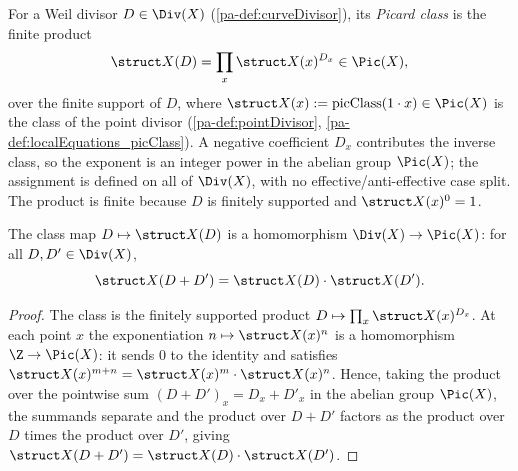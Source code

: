\begin{definition}
  \label{pa-def:divisorClass}
  \leanok

  For a Weil divisor \(D \in \Div(X)\) (\ref{pa-def:curveDivisor}), its \emph{Picard class} is the
  finite product
  \[
    \struct X(D) = \prod_{x} \struct X(x)^{D_x} \in \Pic(X),
  \]
  over the finite support of \(D\), where \(\struct X(x) := \mathrm{picClass}(1 \cdot x) \in
  \Pic(X)\) is the class of the point divisor (\ref{pa-def:pointDivisor}, \ref{pa-def:localEquations_picClass}).
  A negative coefficient \(D_x\) contributes the inverse class, so the exponent is an integer power
  in the abelian group \(\Pic(X)\); the assignment is defined on all of \(\Div(X)\), with no
  effective/anti-effective case split. The product is finite because \(D\) is finitely supported
  and \(\struct X(x)^0 = 1\).
\end{definition}

\begin{theorem}
  \label{pa-thm:divisorClass_add}
  \leanok

  The class map \(D \mapsto \struct X(D)\) is a homomorphism \(\Div(X) \to \Pic(X)\): for all
  \(D, D' \in \Div(X)\),
  \[
    \struct X(D + D') = \struct X(D) \cdot \struct X(D') .
  \]
\end{theorem}
\begin{proof}
  \leanok
  The class is the finitely supported product \(D \mapsto \prod_x \struct X(x)^{D_x}\). At each
  point \(x\) the exponentiation \(n \mapsto \struct X(x)^n\) is a homomorphism \(\Z \to \Pic(X)\):
  it sends \(0\) to the identity and satisfies \(\struct X(x)^{m+n} = \struct X(x)^m \cdot \struct
  X(x)^n\). Hence, taking the product over the pointwise sum \((D + D')_x = D_x + D'_x\) in the
  abelian group \(\Pic(X)\), the summands separate and the product over \(D + D'\) factors as the
  product over \(D\) times the product over \(D'\), giving \(\struct X(D + D') = \struct X(D) \cdot
  \struct X(D')\).
\end{proof}

